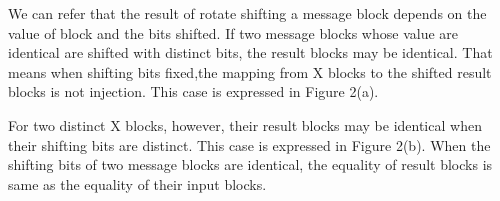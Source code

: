 \documentclass{article}
\begin{document}
We can refer that the result of rotate shifting a message block depends on the
value of block and the bits shifted.  If two message blocks whose value are
identical are shifted with distinct bits, the result blocks may be
identical. That means when shifting bits fixed,the mapping from X blocks to the
shifted result blocks is not injection. This case is expressed in Figure 2(a).

For two distinct X blocks, however, their result blocks may be identical
when their shifting bits are distinct. This case is expressed in Figure 2(b).  
When the shifting bits of two message blocks are identical, the equality of result blocks
is same as the equality of their input blocks.				

\begin{figure}
\centering
{}
\end{figure}
\end{document}
